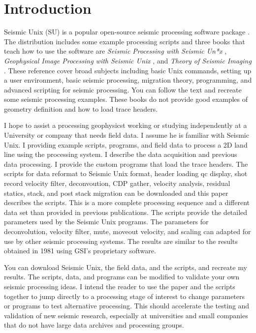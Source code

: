 \section{Introduction}
Seismic Unix (SU) is a popular open-source seismic processing software
package \cite[]{TLE16-07-10451049,cohen}.  The distribution
includes some example processing scripts and three books that
teach how to use the software are \emph{Seismic Processing with Seismic 
Un*x} \cite[]{forel}, \emph{Geophysical Image Processing with Seismic 
Unix} \cite[]{stockwell}, and \emph{Theory of Seismic Imaging} 
\cite[]{Scales} .  These reference cover broad subjects including basic 
Unix commands, setting up a user environment, basic seismic processing, 
migration theory, programming, and advanced scripting for seismic
processing.  You can follow the text and recreate some seismic
processing examples.  These books do not provide good examples of 
geometry definition and how to load trace headers.\nocite{cohen}

I hope to assist a processing geophysicst working or studying independently 
at a University or company that needs field data.  I assume he is familiar 
with Seismic Unix.  I providing example scripts,  programs, and field data 
to process a 2D land line using the processing system. I describe the data 
acquisition and previous data processing.  I provide the custom programs 
that load the trace headers.  The scripts for data reformat to Seismic 
Unix format, header loading qc display, shot record velocity filter, 
deconvoution, CDP gather, velocity analysis, residual statics, stack, 
and post stack migration can be downloaded and this paper describes 
the scripts.  This is a more complete processing sequence and a 
different data set than provided in previous publications.  The scripts 
provide the detailed parameters used by the Seismic Unix programs.  The 
parameters for deconvolution, velocity filter, mute, moveout velocity, 
and scaling can adapted for use by other seismic processing  systems. The 
results are similar to the results obtained in 1981 using GSI's proprietary 
software.  

You can download Seismic Unix, the field data, and the scripts, and 
recreate my results.  The scripts, data, and programs can be modified 
to validate your own seismic processing ideas.  I intend the reader to 
use the paper and the scripts together to jump directly to a processing 
stage of interest to change parameters or programs to test alternative 
processing.  This should accelerate the testing and validation 
of new seismic research, especially at universities and small companies that 
do not have large data archives and processing groups.

